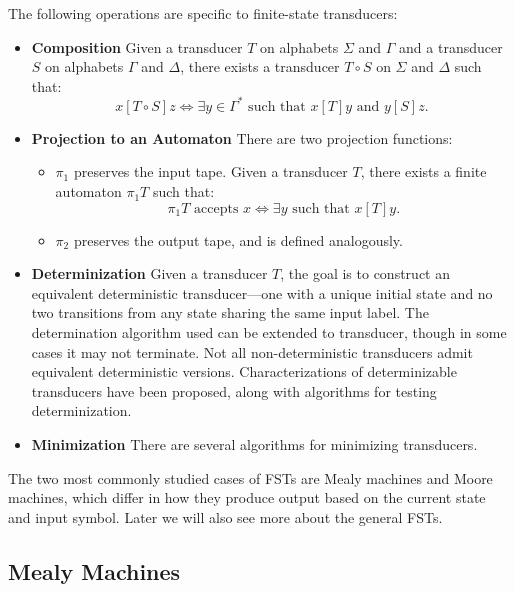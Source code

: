 The following operations are specific to finite-state transducers:

\begin{itemize}

    \item \textbf{Composition} Given a transducer $T$ on alphabets $\Sigma$ and $\Gamma$ and a transducer $S$ on alphabets $\Gamma$ and $\Delta$, 
    there exists a transducer $T \circ S$ on $\Sigma$ and $\Delta$ such that:
    \[
    x[T \circ S]z \iff \exists y \in \Gamma^* \text{ such that } x[T]y \text{ and } y[S]z.
    \]

    \item \textbf{Projection to an Automaton} There are two projection functions:
    \begin{itemize}
        \item $\pi_1$ preserves the input tape. Given a transducer $T$, there exists a finite automaton $\pi_1 T$ such that:
        \[
        \pi_1 T \text{ accepts } x \iff \exists y \text{ such that } x[T]y.
        \]

        \item $\pi_2$ preserves the output tape, and is defined analogously.
    \end{itemize}

    \item \textbf{Determinization} Given a transducer $T$, the goal is to construct an equivalent deterministic 
    transducer—one with a unique initial state and no two transitions from any state sharing the same input label. 
    The determination algorithm used can be extended to transducer, though in some cases it may not terminate. 
    Not all non-deterministic transducers admit equivalent deterministic versions. 
    Characterizations of determinizable transducers have been proposed, along with algorithms for testing determinization. 

    \item \textbf{Minimization} There are several algorithms for minimizing transducers.

\end{itemize}
The two most commonly studied cases of FSTs are Mealy machines and Moore machines, which differ in how they produce output based on the current state and input symbol.
Later we will also see more about the general FSTs.

\subsection{Mealy Machines}

